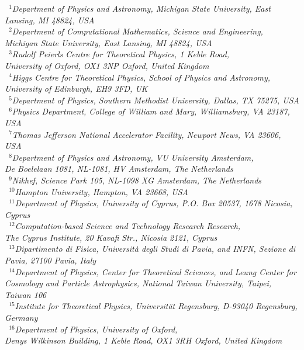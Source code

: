 \documentclass[twoside,12pt]{article}
\numberwithin{equation}{section}
\numberwithin{figure}{section}
\numberwithin{table}{section}
\begin{document}
\begin{center}
\vspace{.2cm}
{\it \footnotesize
~$^{1}$Department of Physics and Astronomy, 
Michigan State University, East Lansing, MI 48824, USA\\
~$^{2}$Department of Computational Mathematics, Science and Engineering,\\
Michigan State University, East Lansing, MI 48824, USA\\
~$^{3}$Rudolf Peierls Centre for Theoretical Physics, 1 Keble Road,\\ 
University of Oxford, OX1 3NP Oxford, United Kingdom\\
~$^{4}$Higgs Centre for Theoretical Physics, School of Physics and Astronomy,\\ 
University of Edinburgh, EH9 3FD, UK\\
~$^{5}$Department of Physics, 
Southern Methodist University, Dallas, TX 75275, USA\\
~$^{6}$Physics Department, 
College of William and Mary, Williamsburg, VA 23187, USA\\
~$^{7}$Thomas Jefferson National Accelerator Facility, 
Newport News, VA 23606, USA\\
~$^{8}$Department of Physics and Astronomy, VU University Amsterdam,\\
De Boelelaan 1081, NL-1081, HV Amsterdam, The Netherlands\\
~$^{9}$Nikhef, Science Park 105, NL-1098 XG Amsterdam, The Netherlands\\
~$^{10}$Hampton University, Hampton, VA 23668, USA\\
~$^{11}$Department of Physics, 
University of Cyprus, P.O. Box 20537, 1678 Nicosia, Cyprus\\
~$^{12}$Computation-based Science and Technology Research Research,\\
The Cyprus Institute, 20 Kavafi Str., Nicosia 2121, Cyprus\\
~$^{13}$Dipartimento di Fisica, Universit\`{a} degli Studi di Pavia, and INFN, 
Sezione di Pavia, 27100 Pavia, Italy\\
~$^{14}$Department of Physics, Center for Theoretical Sciences,
and Leung Center for Cosmology and Particle Astrophysics,
National Taiwan University, Taipei, Taiwan 106\\
~$^{15}$Institute for Theoretical Physics, 
Universit\"at Regensburg, D-93040 Regensburg, Germany\\
~$^{16}$Department of Physics, University of Oxford,\\
Denys Wilkinson Building, 1 Keble Road, OX1 3RH Oxford, United Kingdom\\
}
\end{center}
\end{document}
